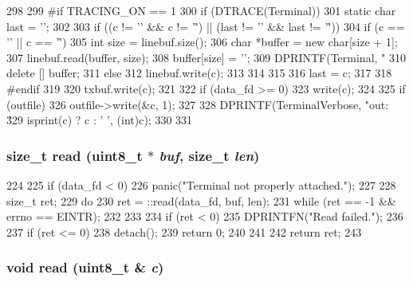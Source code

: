 \begin{DoxyCode}
298 {
299 #if TRACING_ON == 1
300     if (DTRACE(Terminal)) {
301         static char last = '\0';
302 
303         if ((c != '\n' && c != '\r') || (last != '\n' && last != '\r')) {
304             if (c == '\n' || c == '\r') {
305                 int size = linebuf.size();
306                 char *buffer = new char[size + 1];
307                 linebuf.read(buffer, size);
308                 buffer[size] = '\0';
309                 DPRINTF(Terminal, "%
310                 delete [] buffer;
311             } else {
312                 linebuf.write(c);
313             }
314         }
315 
316         last = c;
317     }
318 #endif
319 
320     txbuf.write(c);
321 
322     if (data_fd >= 0)
323         write(c);
324 
325     if (outfile)
326         outfile->write(&c, 1);
327 
328     DPRINTF(TerminalVerbose, "out: \'%
329             isprint(c) ? c : ' ', (int)c);
330 
331 }
\end{DoxyCode}
\hypertarget{classTerminal_a9f8a094b410fa145da19663f83f241e3}{
\subsubsection[{read}]{\setlength{\rightskip}{0pt plus 5cm}size\_\-t read (uint8\_\-t $\ast$ {\em buf}, \/  size\_\-t {\em len})}}
\label{classTerminal_a9f8a094b410fa145da19663f83f241e3}



\begin{DoxyCode}
224 {
225     if (data_fd < 0)
226         panic("Terminal not properly attached.\n");
227 
228     size_t ret;
229     do {
230       ret = ::read(data_fd, buf, len);
231     } while (ret == -1 && errno == EINTR);
232 
233 
234     if (ret < 0)
235         DPRINTFN("Read failed.\n");
236 
237     if (ret <= 0) {
238         detach();
239         return 0;
240     }
241 
242     return ret;
243 }
\end{DoxyCode}
\hypertarget{classTerminal_ad584a0aa9613e91193e6d6649bf6c171}{
\subsubsection[{read}]{\setlength{\rightskip}{0pt plus 5cm}void read (uint8\_\-t \& {\em c})}}
\label{classTerminal_ad584a0aa9613e91193e6d6649bf6c171}



